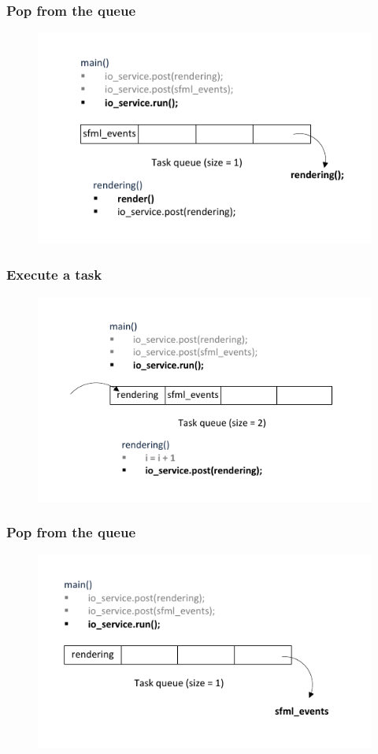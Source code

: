 \documentclass[xcolor=dvipsnames]{beamer}
\begin{document}
\begin{frame}
\frametitle{Pop from the queue}
\begin{figure}[p]
  \centering
  \includegraphics{images/queue-frame4.pdf}
\end{figure}
\end{frame}

\begin{frame}
\frametitle{Execute a task}
\begin{figure}[p]
  \centering
  \includegraphics{images/queue-frame5.pdf}
\end{figure}
\end{frame}

\begin{frame}
\frametitle{Pop from the queue}
\begin{figure}[p]
  \centering
  \includegraphics{images/queue-frame6.pdf}
\end{figure}
\end{frame}
\end{document}
